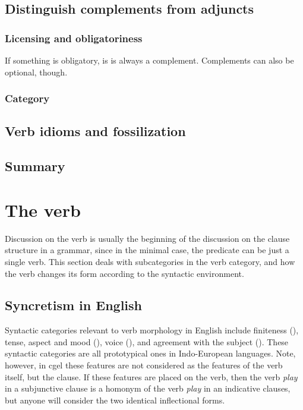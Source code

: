 \documentclass{article}
\newcommand*{\corpus}[1]{\emph{#1}}
\begin{document}
\subsection{Distinguish complements from adjuncts}\label{sec:recognizing-complement-clause}

\subsubsection{Licensing and obligatoriness}

If something is obligatory, is is always a complement.
Complements can also be optional, though.


\subsubsection{Category}

\subsection{Verb idioms and fossilization}

\subsection{Summary}



\section{The verb}

Discussion on the verb is usually the beginning of the discussion on the clause structure in a grammar,
since in the minimal case, 
the predicate can be just a single verb.
This section deals with subcategories in the verb category,
and how the verb changes its form according to the syntactic environment.

\subsection{Syncretism in English}

Syntactic categories relevant to verb morphology in English include 
finiteness (),
tense, aspect and mood (),
voice (),
and agreement with the subject ().
These syntactic categories are all prototypical ones in Indo-European languages.
Note, however, in \ac{cgel} these features are not considered as the features of the verb itself,
but the clause. 
If these features are placed on the verb, 
then the verb \corpus{play} in a subjunctive clause is a homonym of 
the verb \corpus{play} in an indicative clauses,
but anyone will consider the two identical inflectional forms.
\end{document}
